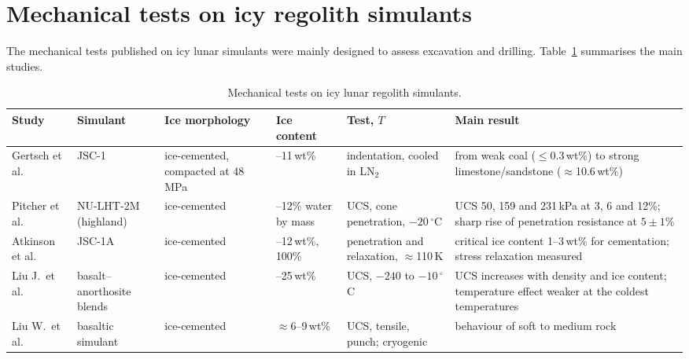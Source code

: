 \section{Mechanical tests on icy regolith simulants}
\label{sec:icy_regolith_data}

The mechanical tests published on icy lunar simulants were mainly designed to assess excavation and drilling. Table~\ref{tab:icy_tests} summarises the main studies.

\begin{table}[H]
    \centering
    \caption{Mechanical tests on icy lunar regolith simulants.}
    \label{tab:icy_tests}
    \footnotesize
    \renewcommand{\arraystretch}{1.15}
    \begin{tabularx}{\textwidth}{|>{\raggedright\arraybackslash}p{1.9cm}|>{\raggedright\arraybackslash}p{1.5cm}|>{\raggedright\arraybackslash}p{1.9cm}|>{\raggedright\arraybackslash}p{1.5cm}|>{\raggedright\arraybackslash}p{1.9cm}|>{\raggedright\arraybackslash}X|}
        \hline
        \textbf{Study} & \textbf{Simulant} & \textbf{Ice morphology} & \textbf{Ice content} & \textbf{Test, $T$} & \textbf{Main result} \\
        \hline
        Gertsch et al.~\cite{gertsch2006} & JSC-1 & ice-cemented, compacted at 48\,MPa & 0--11\,wt\% & indentation, cooled in LN$_2$ & from weak coal ($\le$0.3\,wt\%) to strong limestone/sandstone ($\approx$10.6\,wt\%) \\
        \hline
        Pitcher et al.~\cite{pitcher2016} & NU-LHT-2M (highland) & ice-cemented & 3--12\% water by mass & UCS, cone penetration, $-20\,^\circ$C & UCS 50, 159 and 231\,kPa at 3, 6 and 12\%; sharp rise of penetration resistance at $5\pm1$\% \\
        \hline
        Atkinson et al.~\cite{atkinson2020} & JSC-1A & ice-cemented & 0--12\,wt\%, 100\% & penetration and relaxation, $\approx$110\,K & critical ice content 1--3\,wt\% for cementation; stress relaxation measured \\
        \hline
        Liu J.\ et al.~\cite{liu2022} & basalt--anorthosite blends & ice-cemented & 5--25\,wt\% & UCS, $-240$ to $-10\,^\circ$C & UCS increases with density and ice content; temperature effect weaker at the coldest temperatures \\
        \hline
        Liu W.\ et al.~\cite{liu2024} & basaltic simulant & ice-cemented & $\approx$6--9\,wt\% & UCS, tensile, punch; cryogenic & behaviour of soft to medium rock \\

\end{tabularx}
\end{table}

